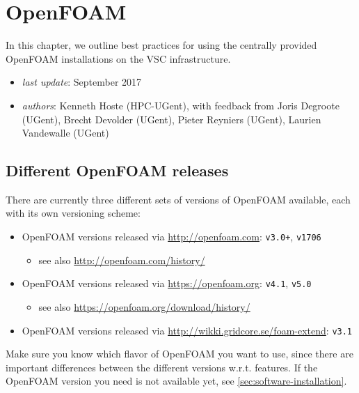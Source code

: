 \chapter{OpenFOAM}
\label{ch:openfoam}

In this chapter, we outline best practices for using the centrally provided OpenFOAM installations
on the VSC \hpc infrastructure.

\begin{itemize}
    \item \emph{last update}: September 2017
    \item \emph{authors}: Kenneth Hoste (HPC-UGent), with feedback from Joris Degroote (UGent), Brecht Devolder (UGent),
        Pieter Reyniers (UGent), Laurien Vandewalle (UGent)
\end{itemize}



\section{Different OpenFOAM releases}
\label{sec:best-practices-openfoam-releases}

There are currently three different sets of versions of OpenFOAM available, each with its own versioning scheme:
\begin{itemize}
    \item OpenFOAM versions released via \url{http://openfoam.com}: \lstinline|v3.0+|, \lstinline|v1706|
    \begin{itemize}
        \item see also \url{http://openfoam.com/history/}
    \end{itemize}
    \item OpenFOAM versions released via \url{https://openfoam.org}: \lstinline|v4.1|, \lstinline|v5.0|
    \begin{itemize}
        \item see also \url{https://openfoam.org/download/history/}
    \end{itemize}
    \item OpenFOAM versions released via \url{http://wikki.gridcore.se/foam-extend}: \lstinline|v3.1|
\end{itemize}

Make sure you know which flavor of OpenFOAM you want to use, since there are important differences between
the different versions w.r.t. features.
If the OpenFOAM version you need is not available yet, see \autoref{sec:software-installation}.

